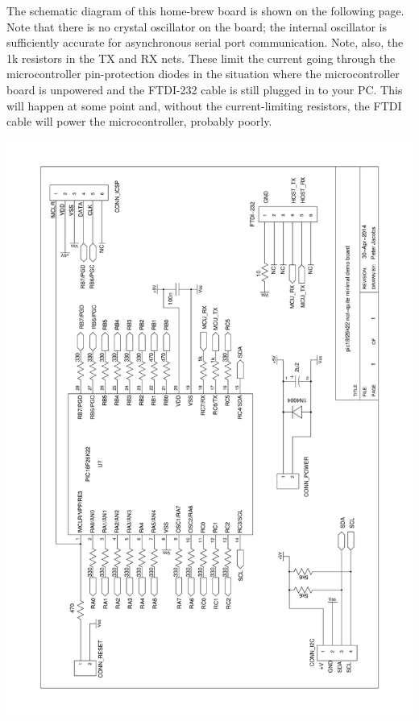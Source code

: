 \documentclass[12pt,a4paper]{article}
\begin{document}
\medskip\noindent
The schematic diagram of this home-brew board is shown on the following page.
Note that there is no crystal oscillator on the board; the internal oscillator is 
sufficiently accurate for asynchronous serial port communication.
Note, also, the 1k resistors in the TX and RX nets.  
These limit the current going through the microcontroller pin-protection diodes
in the situation where the microcontroller board is unpowered and the FTDI-232 cable
is still plugged in to your PC.
This will happen at some point and, without the current-limiting resistors, the FTDI cable
will power the microcontroller, probably poorly.


\newpage
\noindent
\includegraphics[width=\textwidth,angle=0,viewport=48 37 547 806]{../figs/demo-board-schematic-26k22.pdf}

\medskip
\end{document}
